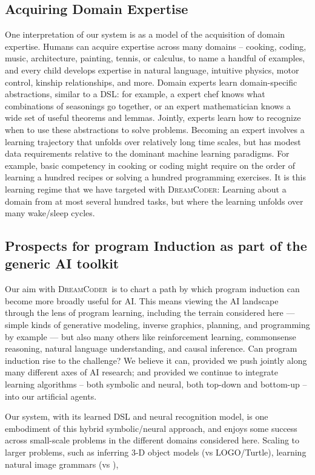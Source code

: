 \documentclass{article}
\newcommand{\system}{\textsc{DreamCoder}~}
\newcommand{\systemEnding}{\textsc{DreamCoder}}
\begin{document}
\subsection{Acquiring Domain Expertise}

One interpretation of our system is as a model of the acquisition of
domain expertise. Humans can acquire expertise across many domains --
cooking, coding, music, architecture, painting, tennis, or calculus,
to name a handful of examples, and every child develops expertise in
natural language, intuitive physics, motor control, kinship
relationships, and more. Domain experts learn domain-specific
abstractions, similar to a DSL: for example, a expert chef knows what
combinations of seasonings go together, or an expert mathematician
knows a wide set of useful theorems and lemmas.  Jointly, experts
learn how to recognize when to use these abstractions to solve
problems.  Becoming an expert involves a learning trajectory that
unfolds over relatively long time scales, but has modest data
requirements relative to the dominant machine learning paradigms. For
example, basic competency in cooking or coding might require on the
order of learning a hundred recipes or solving a hundred programming
exercises.  It is this learning regime that we have targeted with
\systemEnding: Learning about a domain from at most several hundred
tasks, but where the learning unfolds over many wake/sleep cycles.



\subsection{Prospects for program Induction as part of the generic AI toolkit}

Our aim with \system is to chart a path by which program induction can
become more broadly useful for AI.  This means viewing the AI
landscape through the lens of program learning, including the terrain
considered here --- simple kinds of generative modeling, inverse
graphics, planning, and programming by example --- but also many
others like reinforcement learning, commonsense reasoning, natural
language understanding, and causal inference. Can program induction
rise to the challenge?  We believe it can, provided we push jointly
along  many different axes of AI research; and provided we continue
to integrate learning algorithms -- both symbolic and neural, both
top-down and bottom-up -- into our artificial agents.

Our system, with its learned DSL and neural recognition model, is one
embodiment of this hybrid symbolic/neural approach, and enjoys some
success across small-scale problems in the different domains considered
here. Scaling to larger problems,
such as inferring 3-D object models (vs LOGO/Turtle),
learning natural image grammars (vs ),
\end{document}
